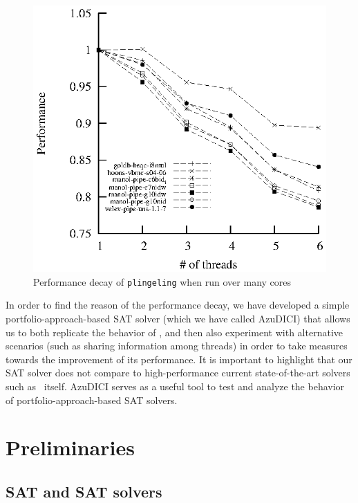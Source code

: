 \documentclass{llncs}
\begin{document}
\begin{figure}[tp]
  \centering
  \includegraphics[scale=1]{plingeling_6cores_speedup}
  \caption{Performance decay of {\tt plingeling} when run over many cores}
  \label{fig:decay}
\end{figure}

In order to find the reason of the performance decay, we have
developed a simple portfolio-approach-based SAT solver (which we have
called AzuDICI) that allows us to both replicate the behavior of
\pling, and then also experiment with alternative scenarios (such as
sharing information among threads) in order to take measures towards
the improvement of its performance. It is important to highlight that
our SAT solver does not compare to high-performance current
state-of-the-art solvers such as \pling\ itself. AzuDICI serves as a
useful tool to test and analyze the behavior of
portfolio-approach-based SAT solvers.


\section{Preliminaries}
\label{sec:preliminaries}

\subsection{SAT and SAT solvers}
\end{document}
